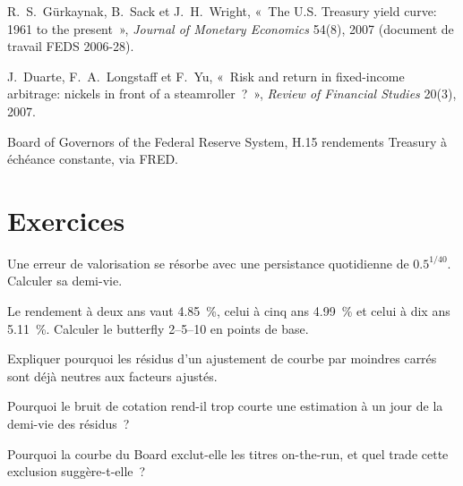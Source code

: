 \begin{omsources}
\item R.~S.~Gürkaynak, B.~Sack et J.~H.~Wright, «~The U.S. Treasury yield curve: 1961 to the present~», \emph{Journal of Monetary Economics}
54(8), 2007 (document de travail FEDS 2006-28).
\item J.~Duarte, F.~A.~Longstaff et F.~Yu, «~Risk and return in fixed-income arbitrage: nickels in front of a steamroller~?~», \emph{Review of
Financial Studies} 20(3), 2007.
\item Board of Governors of the Federal Reserve System, H.15 rendements Treasury à échéance constante, via FRED.
\end{omsources}

\section{Exercices}

\begin{exercise}[$\star$]\label{exo:s2:government-bond-relative-value:1}
Une erreur de valorisation se résorbe avec une persistance quotidienne de $0.5^{1/40}$. Calculer sa demi-vie.
\end{exercise}

\begin{exercise}[$\star$]\label{exo:s2:government-bond-relative-value:2}
Le rendement à deux ans vaut 4.85~\%, celui à cinq ans 4.99~\% et celui à dix ans 5.11~\%. Calculer le butterfly 2--5--10 en points de base.
\end{exercise}

\begin{exercise}[$\star$]\label{exo:s2:government-bond-relative-value:3}
Expliquer pourquoi les résidus d'un ajustement de courbe par moindres carrés sont déjà neutres aux facteurs ajustés.
\end{exercise}

\begin{exercise}[$\star\star$]\label{exo:s2:government-bond-relative-value:4}
Pourquoi le bruit de cotation rend-il trop courte une estimation à un jour de la demi-vie des résidus~?
\end{exercise}

\begin{exercise}[$\star\star$]\label{exo:s2:government-bond-relative-value:5}
Pourquoi la courbe du Board exclut-elle les titres on-the-run, et quel trade cette exclusion suggère-t-elle~?
\end{exercise}

